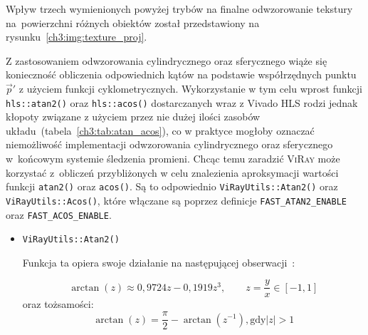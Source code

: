 \begin{enumerate}
Wpływ trzech wymienionych powyżej trybów na finalne odwzorowanie tekstury na~powierzchni różnych obiektów został przedstawiony na rysunku~\ref{ch3:img:texture_proj}.



Z zastosowaniem odwzorowania cylindrycznego oraz sferycznego wiąże się konieczność obliczenia odpowiednich kątów na podstawie współrzędnych punktu $\vec{p}'$ z użyciem funkcji cyklometrycznych. Wykorzystanie w tym celu wprost funkcji \texttt{hls::atan2()} oraz \texttt{hls::acos()} dostarczanych wraz z Vivado HLS rodzi jednak kłopoty związane z użyciem przez nie dużej ilości zasobów układu~(tabela~\ref{ch3:tab:atan_acos}), co w praktyce mogłoby oznaczać niemożliwość implementacji odwzorowania cylindrycznego oraz sferycznego w~końcowym systemie śledzenia promieni. Chcąc temu zaradzić \textsc{ViRay} może korzystać z~obliczeń przybliżonych w celu znalezienia aproksymacji wartości funkcji \texttt{atan2()} oraz \texttt{acos()}. Są to odpowiednio \texttt{ViRayUtils::Atan2()} oraz \texttt{ViRayUtils::Acos()}, które włączane są poprzez definicje \texttt{FAST\_ATAN2\_ENABLE} oraz \texttt{FAST\_ACOS\_ENABLE}.




\begin{itemize}
\item \texttt{ViRayUtils::Atan2()}

Funkcja ta opiera swoje działanie na następującej obserwacji~\cite{ATAN_APPROX}:

\begin{equation}
\arctan(z)\approx 0,9724z - 0,1919z^3,\qquad z=\frac{y}{x}\in[-1, 1]
\end{equation}
oraz tożsamości:
\begin{equation}
\arctan(z) = \frac{\pi}{2} - \arctan\left(z^{-1}\right), \mathrm{gdy} \left| z \right| > 1
\end{equation}


\end{itemize}
\end{enumerate}
